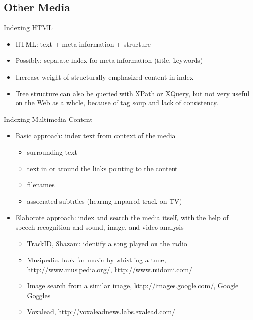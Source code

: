 \subsection{Other Media}

\begin{frame}{Indexing HTML}
\begin{itemize}
\item HTML: text + \alert{meta-information} + \alert{structure}

\item Possibly: \alert{separate index} for meta-information (title, keywords)

\item \alert{Increase weight} of structurally emphasized content in index

\item \alert{Tree structure} can also be queried with XPath or XQuery, but not
very useful on the Web as a whole, because of tag soup and lack of
consistency.
\end{itemize}
\end{frame}

\begin{frame}{Indexing Multimedia Content}

\begin{itemize}

\item Basic approach: index \alert{text from context} of the media
\begin{itemize}
\item surrounding text
\item text in or around the links pointing to the content
\item filenames
\item associated subtitles (hearing-impaired track on TV)
\end{itemize}

\item Elaborate approach: index and search the media itself, with the
help of \alert{speech recognition} and \alert{sound, image, and video
analysis}
\begin{itemize}
\item TrackID, Shazam: identify a song played on the radio
\item Musipedia: look for music by whistling a tune,
\url{http://www.musipedia.org/}, \url{http://www.midomi.com/}
\item Image search from a similar image,
\url{http://images.google.com/}, Google Goggles
\item Voxalead, \url{http://voxaleadnews.labs.exalead.com/}
\end{itemize}
\end{itemize}

\end{frame}


